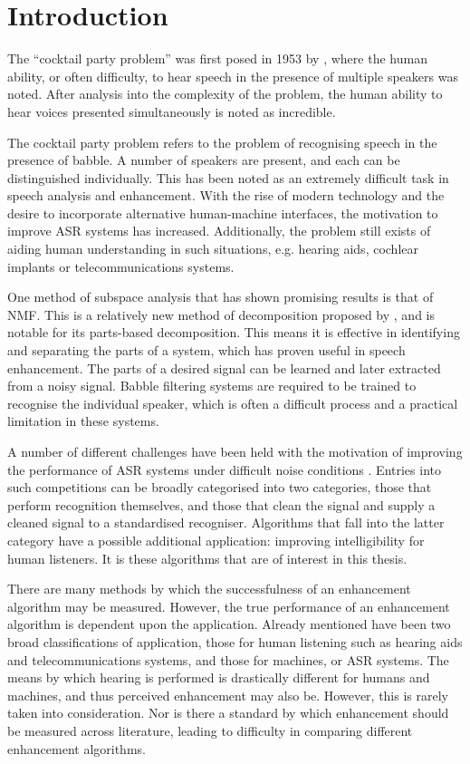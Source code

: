 
\chapter{Introduction}

\acresetall

The ``cocktail party problem'' was first posed in 1953 by \citet{Cherry1953},
where the human ability, or often difficulty, to hear speech in the
presence of multiple speakers was noted. After analysis into the complexity
of the problem, the human ability to hear voices presented simultaneously
is noted as incredible.

The cocktail party problem refers to the problem of recognising speech
in the presence of babble. A number of speakers are present, and each
can be distinguished individually. This has been noted as an extremely
difficult task in speech analysis and enhancement. With the rise of
modern technology and the desire to incorporate alternative human-machine
interfaces, the motivation to improve \ac{ASR} systems has increased.
Additionally, the problem still exists of aiding human understanding
in such situations, e.g. hearing aids, cochlear implants or telecommunications
systems.

One method of subspace analysis that has shown promising results is
that of \ac{NMF}. This is a relatively new method of decomposition
proposed by \citet{Lee1999}, and is notable for its parts-based decomposition.
This means it is effective in identifying and separating the parts
of a system, which has proven useful in speech enhancement. The parts
of a desired signal can be learned and later extracted from a noisy
signal. Babble filtering systems are required to be trained to recognise
the individual speaker, which is often a difficult process and a practical
limitation in these systems.

A number of different challenges have been held with the motivation
of improving the performance of \ac{ASR} systems under difficult
noise conditions \citep{Cooke2010,Barker2013,Vincent2013}. Entries
into such competitions can be broadly categorised into two categories,
those that perform recognition themselves, and those that clean the
signal and supply a cleaned signal to a standardised recogniser. Algorithms
that fall into the latter category have a possible additional application:
improving intelligibility for human listeners. It is these algorithms
that are of interest in this thesis.

There are many methods by which the successfulness of an enhancement
algorithm may be measured. However, the true performance of an enhancement
algorithm is dependent upon the application. Already mentioned have
been two broad classifications of application, those for human listening
such as hearing aids and telecommunications systems, and those for
machines, or \ac{ASR} systems. The means by which hearing is performed
is drastically different for humans and machines, and thus perceived
enhancement may also be. However, this is rarely taken into consideration.
Nor is there a standard by which enhancement should be measured across
literature, leading to difficulty in comparing different enhancement
algorithms.

